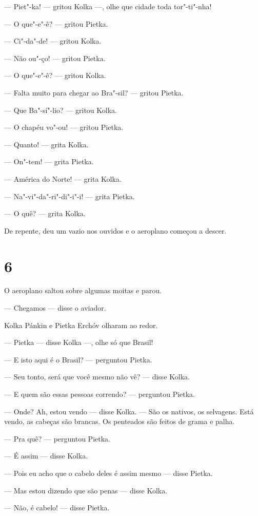 --- Piet"-ka! --- gritou Kolka ---, olhe que cidade toda tor"-ti"-nha!

--- O que"-e"-ê? --- gritou Pietka.

--- Ci"-da"-de! --- gritou Kolka.

--- Não ou"-ço! --- gritou Pietka.

--- O que"-e"-ê? --- gritou Kolka.

--- Falta muito para chegar ao Bra"-sil? --- gritou Pietka.

--- Que Ba"-sí"-lio? --- gritou Kolka.

--- O chapéu vo"-ou! --- gritou Pietka.

--- Quanto! --- grita Kolka.

--- On"-tem! --- grita Pietka.

--- América do Norte! --- grita Kolka.

--- Na"-vi"-da"-ri"-di"-i"-i! --- grita Pietka.

--- O quê? --- grita Kolka.

De repente, deu um vazio nos ouvidos e o aeroplano começou a descer.

\section{6}

O aeroplano saltou sobre algumas moitas e parou.

--- Chegamos --- disse o aviador.

Kolka Pánkin e Pietka Erchóv olharam ao redor.

--- Pietka --- disse Kolka ---, olhe só que Brasil!

--- E isto aqui é o Brasil? --- perguntou Pietka.

--- Seu tonto, será que você mesmo não vê? --- disse Kolka.

--- E quem são essas pessoas correndo? --- perguntou Pietka.

--- Onde? Ah, estou vendo --- disse Kolka. --- São os nativos, os
selvagens. Está vendo, as cabeças são brancas. Os penteados são feitos
de grama e palha.

--- Pra quê? --- perguntou Pietka.

--- É assim --- disse Kolka.

--- Pois eu acho que o cabelo deles é assim mesmo --- disse Pietka.

--- Mas estou dizendo que são penas --- disse Kolka.

--- Não, é cabelo! --- disse Pietka.

